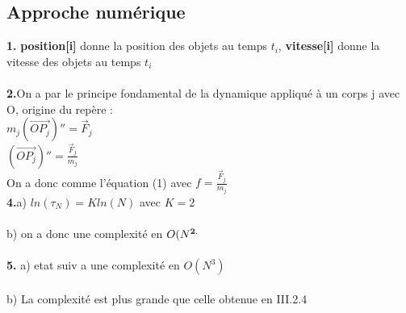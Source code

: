 \documentclass{article}
\begin{document}
\subsection{Approche numérique}
{\bf 1.} {\bf position[i]} donne la position des objets au temps $t_i$, {\bf vitesse[i]} donne la vitesse des objets au temps $t_i$ \\
\\
{\bf 2.}On a par le principe fondamental de la dynamique appliqué à un corps j avec O, origine du repère : \\
$ m_j (\overrightarrow{OP_j})'' = \vec F_j $ \\
$(\overrightarrow{OP_j})'' =\frac{ \vec F_j}{m_j} $ \\
On a donc comme l'équation (1) avec $f=\frac{ \vec F_j}{m_j}$ \\

{\bf 4.}a) $ln(\tau_N)=Kln(N)$ avec $K=2$ \\
\\
b) on a donc une complexité en $O(N^{\bf 2.}$ \\
\\
{\bf 5.} a) etat suiv a une complexité en $O(N^3)$ \\
\\
b) La complexité est plus grande que celle obtenue en III.2.4 \\

\end{document}
